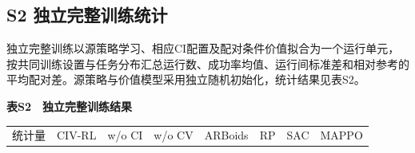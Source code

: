 \documentclass[UTF8,a4paper,zihao=5,fontset=none]{ctexart}
\begin{document}
\subsection*{S2 独立完整训练统计}

独立完整训练以源策略学习、相应CI配置及配对条件价值拟合为一个运行单元，按共同训练设置与任务分布汇总运行数、成功率均值、运行间标准差和相对参考的平均配对差。源策略与价值模型采用独立随机初始化，统计结果见表S2。

\begin{center}\small\bfseries 表S2　独立完整训练结果\end{center}

\begingroup
\small
\setlength{\tabcolsep}{3.2pt}
\begin{longtable}{@{}>{\raggedright\arraybackslash}p{}
>{\raggedright\arraybackslash}p{}
>{\raggedright\arraybackslash}p{}
>{\raggedright\arraybackslash}p{}
>{\raggedright\arraybackslash}p{}
>{\raggedright\arraybackslash}p{}
>{\raggedright\arraybackslash}p{}
>{\raggedright\arraybackslash}p{}@{}}
\toprule\noalign{}
\begin{minipage}[b]{\linewidth}\raggedright
统计量
\end{minipage} & \begin{minipage}[b]{\linewidth}\raggedright
CIV-RL
\end{minipage} & \begin{minipage}[b]{\linewidth}\raggedright
w/o CI
\end{minipage} & \begin{minipage}[b]{\linewidth}\raggedright
w/o CV
\end{minipage} & \begin{minipage}[b]{\linewidth}\raggedright
ARBoids
\end{minipage} & \begin{minipage}[b]{\linewidth}\raggedright
RP
\end{minipage} & \begin{minipage}[b]{\linewidth}\raggedright
SAC
\end{minipage} & \begin{minipage}[b]{\linewidth}\raggedright
MAPPO
\end{minipage} \\

\end{longtable}
\end{document}
